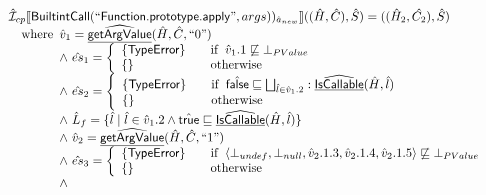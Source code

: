 \documentclass{article}
\newcommand{\SF}[1]{\mbox{\textsf{#1}}}
\newcommand{\wherec}[1]{{\rm where}\begin{array}[t]{l}#1\end{array}}
\newcommand{\ifc}[1]{{\rm if}\begin{array}[t]{l}#1\end{array}}
\newcommand{\owc}{{\rm otherwise}}
\newcommand{\aI}{\hat{\mathcal{I}}}
\newcommand{\lbr}{\llbracket}
\newcommand{\rbr}{\rrbracket}
\newcommand{\ahf}[1]{\widehat{\underline{\sf #1}}}
\newcommand{\atrue}{\hat{\SF{true}}}
\newcommand{\afalse}{\hat{\SF{false}}}
\begin{document}
\[\begin{array}{l}
\aI _{cp}\lbr \SF{BuiltintCall}(``\SF{Function.prototype.apply}",args))_{\hat{a}_{new}}\rbr((\hat{H},\hat{C}), \hat{S})
  = ((\hat{H}_2, \hat{C_2}), \hat{S})\\
\quad\wherec{
  \hat{v}_1 =\ahf{getArgValue}(\hat{H}, \hat{C}, ``0")\\
  \land\ \hat{es}_1 =
    \left\{
    \begin{array}{l@{\quad\quad}l}
      \{ \SF{TypeError} \} & \ifc{\hat{v}_1.1 \not\sqsubseteq \bot_{PValue}}\\
      \{ \}& \owc\\
    \end{array}
    \right.\\
  \land\ \hat{es}_2 =
    \left\{
    \begin{array}{l@{\quad\quad}l}
      \{ \SF{TypeError} \}
      & \ifc{\afalse \sqsubseteq \bigsqcup_{\hat{l}\in\hat{v}_1.2}:\ahf{IsCallable}(\hat{H}, \hat{l})}\\
      \{ \}& \owc\\
    \end{array}
    \right.\\
  \land\ \hat{L}_{f} = \{ \hat{l} \mid \hat{l} \in \hat{v}_1.2 \land \atrue \sqsubseteq \ahf{IsCallable}(\hat{H}, \hat{l})\}\\
  \land\ \hat{v}_2 =\ahf{getArgValue}(\hat{H}, \hat{C}, ``1")\\
  \land\ \hat{es}_3 =
    \left\{
    \begin{array}{l@{\quad\quad}l}
      \{ \SF{TypeError} \}
      & \ifc{\langle\bot_{undef}, \bot_{null}, \hat{v}_2.1.3, \hat{v}_2.1.4, \hat{v}_2.1.5\rangle \not\sqsubseteq \bot_{PValue}}\\
      \{ \}& \owc\\
    \end{array}
    \right.\\
  \land
  }\\
\end{array}
\]
\end{document}
